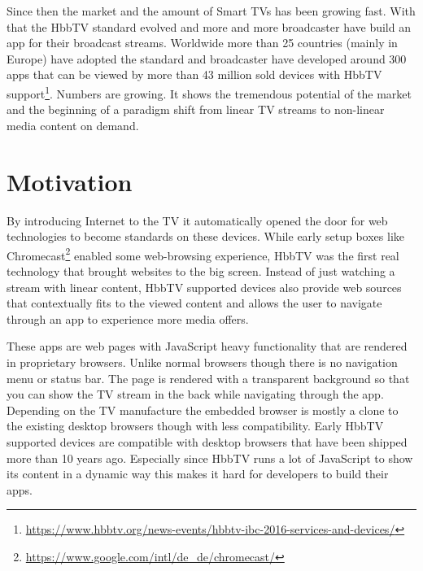 Since then the market and the amount of Smart TVs has been growing fast. With that the HbbTV standard evolved
and more and more broadcaster have build an app for their broadcast streams. Worldwide more than 25 countries
(mainly in Europe) have adopted the standard and broadcaster have developed around 300 apps that can
be viewed by more than 43 million sold devices with HbbTV support\footnote{\url{https://www.hbbtv.org/news-events/hbbtv-ibc-2016-services-and-devices/}}.
Numbers are growing. It shows the tremendous potential of the market and the beginning of a paradigm shift
from linear TV streams to non-linear media content on demand.

\section{Motivation\label{sec:motivation}}

By introducing Internet to the TV it automatically opened the door for web technologies to become standards
on these devices. While early setup boxes like Chromecast\footnote{\url{https://www.google.com/intl/de_de/chromecast/}}
enabled some web-browsing experience, HbbTV was the first real technology that brought websites to the big screen.
Instead of just watching a stream with linear content, HbbTV supported devices also provide web sources that
contextually fits to the viewed content and allows the user to navigate through an app to experience more media
offers.

These apps are web pages with JavaScript heavy functionality that are rendered in proprietary browsers. Unlike
normal browsers though there is no navigation menu or status bar. The page is rendered with a transparent background
so that you can show the TV stream in the back while navigating through the app. Depending on the TV manufacture
the embedded browser is mostly a clone to the existing desktop browsers though with less compatibility.
Early HbbTV supported devices are compatible with desktop browsers that have been shipped more than 10 years ago.
Especially since HbbTV runs a lot of JavaScript to show its content in a dynamic way this makes it hard for
developers to build their apps.

